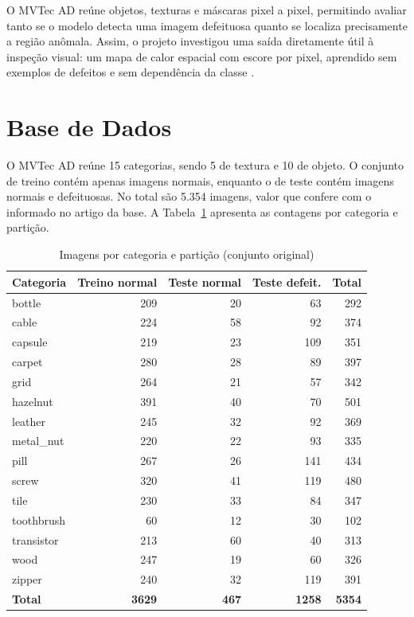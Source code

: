 \documentclass[conference]{IEEEtran}
\begin{document}
O MVTec AD reúne objetos, texturas e máscaras pixel a pixel, permitindo avaliar tanto se o modelo detecta uma imagem defeituosa quanto se localiza precisamente a região anômala. Assim, o projeto investigou uma saída diretamente útil à inspeção visual: um mapa de calor espacial com escore por pixel, aprendido sem exemplos de defeitos e sem dependência da classe \cite{bergmann2021mvtec}.

\section{Base de Dados}
O MVTec AD \cite{bergmann2021mvtec} reúne 15 categorias, sendo 5 de textura e 10 de objeto. O conjunto de treino contém apenas imagens normais, enquanto o de teste contém imagens normais e defeituosas. No total são 5.354 imagens, valor que confere com o informado no artigo da base. A Tabela~\ref{tab:contagem} apresenta as contagens por categoria e partição.

\begin{table}[htbp]
\caption{Imagens por categoria e partição (conjunto original)}
\label{tab:contagem}
\centering
\footnotesize
\setlength{\tabcolsep}{3pt}
\begin{tabular}{lrrrr}
\toprule
Categoria & Treino normal & Teste normal & Teste defeit. & Total \\
\midrule
bottle     & 209 & 20 & 63  & 292 \\
cable      & 224 & 58 & 92  & 374 \\
capsule    & 219 & 23 & 109 & 351 \\
carpet     & 280 & 28 & 89  & 397 \\
grid       & 264 & 21 & 57  & 342 \\
hazelnut   & 391 & 40 & 70  & 501 \\
leather    & 245 & 32 & 92  & 369 \\
metal\_nut & 220 & 22 & 93  & 335 \\
pill       & 267 & 26 & 141 & 434 \\
screw      & 320 & 41 & 119 & 480 \\
tile       & 230 & 33 & 84  & 347 \\
toothbrush & 60  & 12 & 30  & 102 \\
transistor & 213 & 60 & 40  & 313 \\
wood       & 247 & 19 & 60  & 326 \\
zipper     & 240 & 32 & 119 & 391 \\
\midrule
\textbf{Total} & \textbf{3629} & \textbf{467} & \textbf{1258} & \textbf{5354} \\
\bottomrule
\end{tabular}
\end{table}
\end{document}
